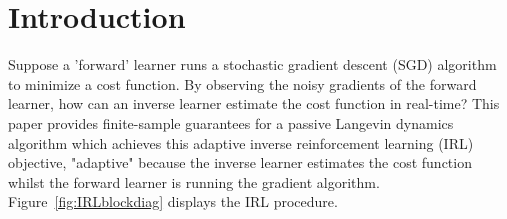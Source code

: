 \documentclass[journal,onecolumn]{IEEEtran}
\begin{document}
\section{Introduction}


Suppose a 'forward' learner runs a stochastic gradient descent (SGD) algorithm to minimize a cost function. By observing the noisy gradients of the forward learner, how can an inverse learner estimate the cost function in real-time? This paper provides finite-sample guarantees for a passive Langevin dynamics algorithm which achieves this adaptive inverse reinforcement learning (IRL) objective, "adaptive" because the inverse learner estimates the cost function whilst the forward learner is running the gradient algorithm. Figure~\ref{fig:IRLblockdiag} displays the IRL procedure.
\end{document}
